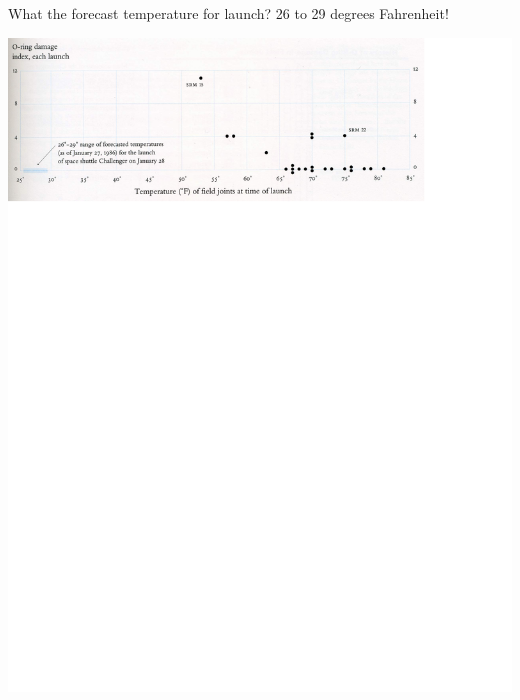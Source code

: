 \documentclass[pdflatex,landscape,titlepage]{foils}
\begin{document}

What the forecast temperature for launch?  26 to 29 degrees Fahrenheit!


\begin{center}
\includegraphics[width=10.5 in]{tufte_challenger_2}
\end{center}
\end{document}
